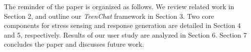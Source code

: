 The reminder of the paper is organized as follows.
We review related work in Section 2, and outline our \emph{TeenChat} framework in
Section 3. Two core components for stress sensing and response generation
are detailed in Section 4 and 5, respectively.
Results of our user study are analyzed in Section 6.
Section 7 concludes the paper and discusses future work.

